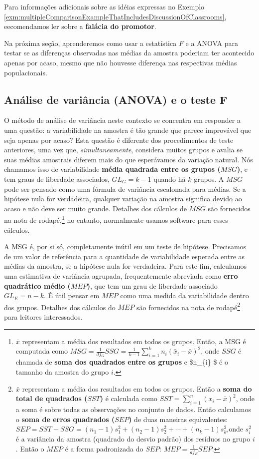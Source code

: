\documentclass[
]{book}
\theoremstyle{definition}
\theoremstyle{definition}
\theoremstyle{definition}
\theoremstyle{definition}
\theoremstyle{remark}
\begin{document}
Para informações adicionais sobre as idéias expressas no Exemplo \ref{exm:multipleComparisonExampleThatIncludesDiscussionOfClassrooms}, eecomendamos ler sobre a \textbf{falácia do promotor}.

Na próxima seção, aprenderemos como usar a estatística \(F\) e a ANOVA para testar se as diferenças observadas nas médias da amostra poderiam ter acontecido apenas por acaso, mesmo que não houvesse diferença nas respectivas médias populacionais.

\hypertarget{ANOVAFTest}{%
\subsection{Análise de variância (ANOVA) e o teste F}\label{ANOVAFTest}}

O método de análise de variância neste contexto se concentra em responder a uma questão: a variabilidade na amostra é tão grande que parece improvável que seja apenas por acaso? Esta questão é diferente dos procedimentos de teste anteriores, uma vez que, \emph{simultaneamente}, considera muitos grupos e avalia se suas médias amostrais diferem mais do que esperávamos da variação natural. Nós chamamos isso de variabilidade \textbf{média quadrada entre os grupos (\(MSG\))}, e tem graus de liberdade associados, \(GL_{G}=k-1\) quando há \(k\) grupos. A \(MSG\) pode ser pensado como uma fórmula de variância escalonada para médias. Se a hipótese nula for verdadeira, qualquer variação na amostra significa devido ao acaso e não deve ser muito grande. Detalhes dos cálculos de \(MSG\) são fornecidos na nota de rodapé,\footnote{\(\bar{x}\) representam a média dos resultados em todos os grupos. Então, a MSG é computada como \(MSG = \frac{1}{df_{G}}SSG = \frac{1}{k-1}\sum_{i=1}^{k} n_{i}\left(\bar{x}_{i} - \bar{x}\right)^2\), onde \(SSG\) é chamada de \textbf{soma dos quadrados entre os grupos} e \$n\_\{i\} \$ é o tamanho da amostra do grupo \(i\).} no entanto, normalmente usamos software para esses cálculos.

A MSG é, por si só, completamente inútil em um teste de hipótese. Precisamos de um valor de referência para a quantidade de variabilidade esperada entre as médias da amostra, se a hipótese nula for verdadeira. Para este fim, calculamos uma estimativa de variância agrupada, frequentemente abreviada como \textbf{erro quadrático médio (\(MEP\))}, que tem um grau de liberdade associado \(GL_E=n-k\). É útil pensar em \(MEP\) como uma medida da variabilidade dentro dos grupos. Detalhes dos cálculos do \(MEP\) são fornecidos na nota de rodapé\footnote{\(\bar{x}\) representam a média dos resultados em todos os grupos. Então a \textbf{soma do total de quadrados (\(SST\))} é calculada como \(SST = \sum_{i=1}^{n} \left(x_{i} - \bar{x}\right)^2\), onde a soma é sobre todas as observações no conjunto de dados. Então calculamos o \textbf{soma de erros quadrados (\(SEP\))} de duas maneiras equivalentes: \(SEP = SST - SSG = (n_1-1)s_1^2 + (n_2-1)s_2^2 + \cdots + (n_k-1)s_k^2\),onde \(s_i^2\) é a variância da amostra (quadrado do desvio padrão) dos resíduos no grupo \(i\). Então o \(MEP\) é a forma padronizada do \(SEP\): \(MEP = \frac{1}{df_{E}}SEP\).} para leitores interessados.
\end{document}

